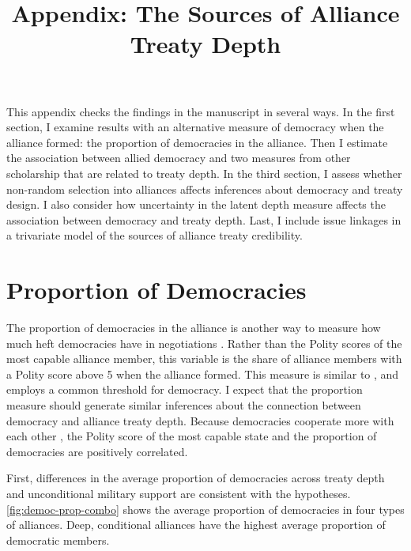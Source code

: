 \documentclass[12pt]{article}
\title{\textbf{Appendix: The Sources of Alliance Treaty Depth}}
\author{}
\date{}
\begin{document}
\maketitle 

\doublespace 

This appendix checks the findings in the manuscript in several ways. 
In the first section, I examine results with an alternative measure of democracy when the alliance formed: the proportion of democracies in the alliance. 
Then I estimate the association between allied democracy and two measures from other scholarship that are related to treaty depth.
In the third section, I assess whether non-random selection into alliances affects inferences about democracy and treaty design.   
I also consider how uncertainty in the latent depth measure affects the association between democracy and treaty depth. 
Last, I include issue linkages in a trivariate model of the sources of alliance treaty credibility. 


\section{Proportion of Democracies}


The proportion of democracies in the alliance is another way to measure how much heft democracies have in negotiations \cite{Chibaetal2015}.  
Rather than the Polity scores of the most capable alliance member, this variable is the share of alliance members with a Polity score above 5 when the alliance formed. 
This measure is similar to \citet{Chibaetal2015}, and employs a common threshold for democracy. 
I expect that the proportion measure should generate similar inferences about the connection between democracy and alliance treaty depth.
Because democracies cooperate more with each other \citep{Leeds1999}, the Polity score of the most capable state and the proportion of democracies are positively correlated. 


First, differences in the average proportion of democracies across treaty depth and unconditional military support are consistent with the hypotheses. 
\autoref{fig:democ-prop-combo} shows the average proportion of democracies in four types of alliances. 
Deep, conditional alliances have the highest average proportion of democratic members.
\end{document}
